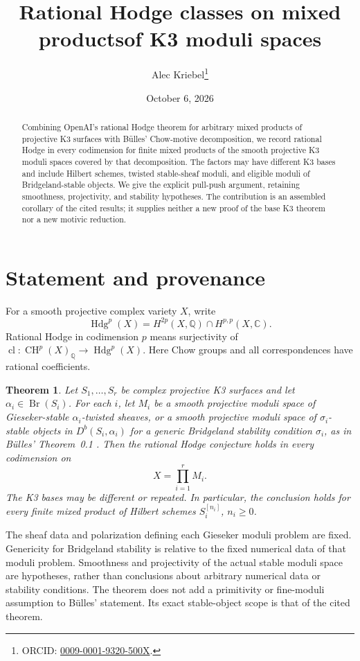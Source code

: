 \documentclass[11pt]{article}
\title{Rational Hodge classes on mixed products\newline of K3 moduli spaces}
\author{Alec Kriebel\thanks{ORCID: \href{https://orcid.org/0009-0001-9320-500X}{0009-0001-9320-500X}.}}
\date{October 6, 2026}
\newtheorem{theorem}{Theorem}
\newcommand{\Q}{\mathbb Q}
\newcommand{\CH}{\operatorname{CH}}
\newcommand{\Hdg}{\operatorname{Hdg}}
\newcommand{\cl}{\operatorname{cl}}
\newcommand{\Br}{\operatorname{Br}}
\begin{document}
\maketitle
\begin{abstract}
Combining OpenAI's rational Hodge theorem for arbitrary mixed products of
projective K3 surfaces with B\"ulles' Chow-motive decomposition, we record
rational Hodge in every codimension for finite mixed products of the smooth
projective K3 moduli spaces covered by that decomposition. The factors may
have different K3 bases and include Hilbert schemes, twisted stable-sheaf
moduli, and eligible moduli of Bridgeland-stable objects. We give the explicit
pull-push argument, retaining smoothness, projectivity, and stability
hypotheses. The contribution is an assembled corollary of the cited results;
it supplies neither a new proof of the base K3 theorem nor a new motivic
reduction.
\end{abstract}

\section{Statement and provenance}
For a smooth projective complex variety $X$, write
\[
 \Hdg^p(X)=H^{2p}(X,\Q)\cap H^{p,p}(X,\mathbb C).
\]
Rational Hodge in codimension $p$ means surjectivity of
$\cl:\CH^p(X)_\Q\to\Hdg^p(X)$. Here Chow groups and all correspondences
have rational coefficients.

\begin{theorem}\label{thm:moduli}
Let $S_1,\ldots,S_r$ be complex projective K3 surfaces and let
$\alpha_i\in\Br(S_i)$. For each $i$, let $M_i$ be a smooth projective
moduli space of Gieseker-stable $\alpha_i$-twisted sheaves, or a smooth
projective moduli space of $\sigma_i$-stable objects in
$D^b(S_i,\alpha_i)$ for a generic Bridgeland stability condition
$\sigma_i$, as in B\"ulles' Theorem~0.1 \cite{Bulles}.
Then the rational Hodge conjecture holds in every codimension on
\[
 X=\prod_{i=1}^r M_i.
\]
The K3 bases may be different or repeated. In particular, the conclusion
holds for every finite mixed product of Hilbert schemes $S_i^{[n_i]}$,
$n_i\geq0$.
\end{theorem}

The sheaf data and polarization defining each Gieseker moduli problem
are fixed. Genericity for Bridgeland stability is relative to the fixed
numerical data of that moduli problem. Smoothness and projectivity of the
actual stable moduli space are hypotheses, rather than conclusions about
arbitrary numerical data or stability conditions. The theorem does not
add a primitivity or fine-moduli assumption to B\"ulles' statement.
Its exact stable-object scope is that of the cited theorem.
\end{document}
